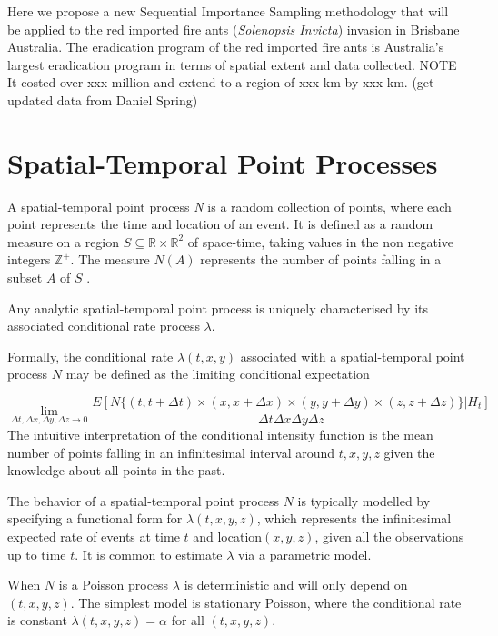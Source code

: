 \documentclass[11pt,a4paper]{article}
\begin{document}
Here we propose a new Sequential Importance Sampling methodology that will be applied to the red imported fire ants (\textit{Solenopsis Invicta}) invasion in Brisbane Australia. \cite{Calcaterra}\cite{Henshaw} The eradication program of the red imported fire ants is Australia's largest eradication program in terms of spatial extent and data collected. {\color{red} NOTE It costed over xxx million and extend to a region of xxx km by xxx km. (get updated data from Daniel Spring)}


\section{Spatial-Temporal Point Processes}

A spatial-temporal point process \textit{N} is a random collection of points, where each point represents the time and location of an event.
It is defined as a random measure on a region $S \subseteq \mathbb{R} \times \mathbb{R}^2$ of space-time, taking values in the non negative integers $\mathbb{Z}^+$. The measure $N(A)$ represents the number of points falling in a subset $A$ of $S$ \cite{Shoenberg}.

Any analytic spatial-temporal point process is uniquely characterised by its associated conditional rate process $\lambda$. 

Formally, the conditional rate $\lambda(t,x,y)$ associated with a spatial-temporal point process $N$ may be defined as the limiting conditional expectation

\[
\lim_{\Delta t, \Delta x, \Delta y, \Delta z \to 0} \frac{ E [ N \{ ( t, t + \Delta t ) \times  ( x, x + \Delta x) \times  ( y, y + \Delta y) \times  ( z, z + \Delta z)\} | H_{t} ]}{\Delta t \Delta x \Delta y \Delta z}
\]
The intuitive interpretation of the conditional intensity function is the mean number of points falling in an infinitesimal interval around $t, x, y, z$ given the knowledge about all points in the past.

The behavior of a spatial-temporal point process $N$ is typically modelled by specifying a functional form for $\lambda(t,x,y,z)$, which represents the infinitesimal expected rate of events at time $t$ and location$(x,y,z)$, given all the observations up to time $t$. It is common to estimate $\lambda$ via a parametric model.

When $N$ is a Poisson process $\lambda$ is deterministic and will only depend on $(t,x,y,z)$. The simplest model is stationary Poisson, where the conditional rate is constant $\lambda(t,x,y,z)=\alpha$ for all $(t,x,y,z)$.
\end{document}
